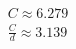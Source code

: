 \documentclass[preview]{standalone}
\begin{document}
\begin{align*}
C \approx 6.279 \\\frac{C}{d} \approx 3.139
\end{align*}
\end{document}
